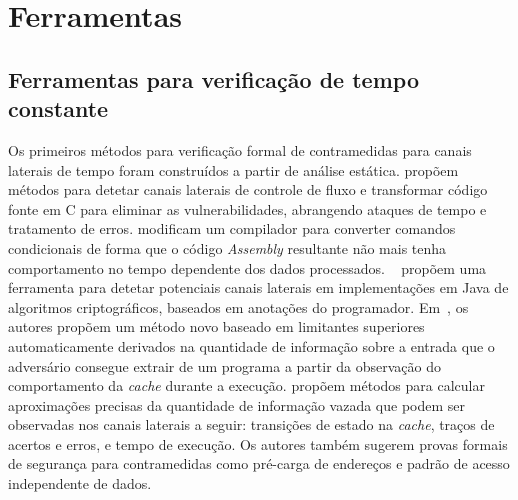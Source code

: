 \documentclass{SBCbookchapter}
\begin{document}

\section{Ferramentas}

%

\subsection{Ferramentas para verificação de tempo constante}

Os primeiros métodos para verificação formal de contramedidas para canais laterais de tempo foram construídos a partir de análise estática. \cite{MolnarPSW05} propõem métodos para detetar canais laterais de controle de fluxo e transformar código fonte em C para eliminar as vulnerabilidades, abrangendo ataques de tempo e tratamento de erros. \cite{CoppensVBS09} modificam um compilador para converter comandos condicionais de forma que o código \emph{Assembly} resultante não mais tenha comportamento no tempo dependente dos dados processados.
~\cite{LuxS11} propõem uma ferramenta para detetar potenciais canais laterais em implementações em Java de algoritmos criptográficos, baseados em anotações do programador. Em~\cite{KopfMO12}, os autores propõem um método novo baseado em limitantes superiores automaticamente derivados na quantidade de informação sobre a entrada que o adversário consegue extrair de um programa a partir da observação do comportamento da \emph{cache} durante a execução. \cite{DoychevKMR15} propõem métodos para calcular aproximações precisas da quantidade de informação vazada que podem ser observadas nos canais laterais a seguir: transições de estado na \emph{cache}, traços de acertos e erros, e tempo de execução. Os autores também sugerem provas formais de segurança para contramedidas
como pré-carga de endereços e padrão de acesso independente de dados.
\end{document}
